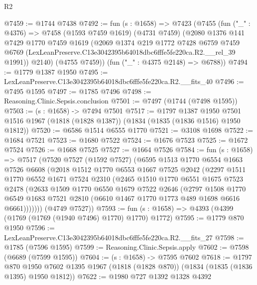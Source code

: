 \begin{lexlean}{R2}
\begin{coremodule}
@7459 := @1744 @7438
@7492 := fun (s : @1658) =>
  @7423
    (@7455
      (fun ("_" : @4376) =>
      @7458
        (@1593 @7459 @1619)
        (@4731 @7459)
        (@2080
          @1376
          @141
          @7429
          @1770
          @7459
          @1619
          (@2069
            @1374
            @219
            @1772
            @7428
            @6759
            @7459
            @6769
            (LexLeanPreserve.C13e3042395b64018dbc6fffe5fe220ca.R2.__rel_39 @1991))
          @2140)
        (@4755 @7459))
      (fun ("_" : @4375 @2148) => @6788))
@7494 := @1779 @1387 @1950
@7495 := LexLeanPreserve.C13e3042395b64018dbc6fffe5fe220ca.R2.__fits_40
@7496 := @7495 @1595
@7497 := @1785 @7496
@7498 := Reasoning.Clinic.Sepsis.conclusion
@7501 := @7497 (@1744 (@7498 @1595))
@7503 := (s : @1658) -> @7494 @7501
@7517 := @1797
    @1387
    @1950
    @7501
    @1516
    @1967
    (@1818 (@1828 @1387))
    (@1834 (@1835 (@1836 @1516) @1950 @1812))
@7520 := @6586 @1514 @6555 @1770
@7521 := @3108 @1698
@7522 := @1684 @7521
@7523 := @1680 @7522
@7524 := @1676 @7523
@7525 := @1672 @7524
@7526 := @1668 @7525
@7527 := @1664 @7526
@7584 := fun (s : @1658) =>
  @7517
    (@7520
      @7527
      (@1592 @7527)
      (@6595
        @1513
        @1770
        @6554
        @1663
        @7526
        @6608
        (@2018
          @1512
          @1770
          @6553
          @1667
          @7525
          @2042
          (@2297
            @1511
            @1770
            @6552
            @1671
            @7524
            @2310
            (@2465
              @1510
              @1770
              @6551
              @1675
              @7523
              @2478
              (@2633
                @1509
                @1770
                @6550
                @1679
                @7522
                @2646
                (@2797
                  @1508
                  @1770
                  @6549
                  @1683
                  @7521
                  @2810
                  (@6610 @1467 @1770 @1773 @489 @1698 @6616 @6661)))))))
      (@4749 @7527))
@7593 := fun (s : @1658) => @4393 (@4399 (@1769 (@1769 (@1940 @7496) @1770) @1770) @1772)
@7595 := @1779 @870 @1950
@7596 := LexLeanPreserve.C13e3042395b64018dbc6fffe5fe220ca.R2.__fits_27
@7598 := @1785 (@7596 @1595)
@7599 := Reasoning.Clinic.Sepsis.apply
@7602 := @7598 (@6689 (@7599 @1595))
@7604 := (s : @1658) -> @7595 @7602
@7618 := @1797
    @870
    @1950
    @7602
    @1395
    @1967
    (@1818 (@1828 @870))
    (@1834 (@1835 (@1836 @1395) @1950 @1812))
@7622 := @1980 @727 @1392 @1328 @4392

\end{coremodule}
\end{lexlean}
